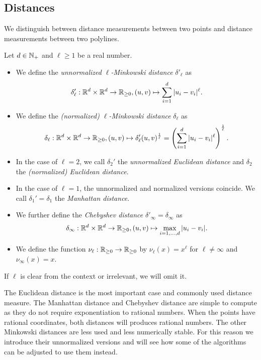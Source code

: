 \subsection{Distances}
\label{ssec:distances}
We distinguish between distance measurements between two points and distance measurements between two polylines. 
\begin{definition}[Distances]\label{def:point_distance}
  Let \(d \in \mathbb{N}_+\) and \(\ell \geq 1\) be a real number.
  \begin{itemize}
    \item We define the \emph{unnormalized \(\ell\)-Minkowski distance} \(\delta'_\ell\) as 
      \[\delta'_\ell:\mathbb{R}^d \times \mathbb{R}^d \to \mathbb{R}_{\geq 0}, (u, v) \mapsto \sum_{i = 1}^d |u_i - v_i|^\ell.\]
    \item We define the \emph{(normalized) \(\ell\)-Minkowski distance} \(\delta_\ell\) as 
      \[\delta_\ell:\mathbb{R}^d \times \mathbb{R}^d \to \mathbb{R}_{\geq 0}, (u, v) \mapsto \delta'_\ell(u, v)^{\frac1\ell} = \left(\sum_{i = 1}^d |u_i - v_i|^\ell\right)^{\frac1\ell}.\]
    \item In the case of \(\ell = 2\), we call \(\delta_2'\)  the \emph{unnormalized Euclidean distance} and \(\delta_2\) the \emph{(normalized) Euclidean distance}.
    \item In the case of \(\ell = 1\), the unnormalized and normalized versions coincide. We call \(\delta_1' = \delta_1\) the \emph{Manhattan distance}. 
    \item We further define the \emph{Chebyshev distance} \(\delta'_\infty = \delta_\infty\) as 
      \[\delta_\infty:\mathbb{R}^d \times \mathbb{R}^d \to \mathbb{R}_{\geq 0}, (u, v) \mapsto \max_{i = 1, \dots, d} |u_i - v_i|.\]
    \item We define the function \(\nu_\ell:\mathbb{R}_{\geq 0} \to \mathbb{R}_{\geq 0}\) by \(\nu_\ell(x) = x^\ell\) for \(\ell \neq \infty\) and \(\nu_\infty(x) = x\).
  \end{itemize}

  If \(\ell\) is clear from the context or irrelevant, we will omit it.
\end{definition}

The Euclidean distance is the most important case and commonly used distance measure. The Manhattan distance and Chebyshev distance are simple to compute as they do not require exponentiation to rational numbers. When the points have rational coordinates, both distances will produces rational numbers.
The other Minkowski distances are less used and less numerically stable. For this reason we introduce their unnormalized versions and will see how some of the algorithms can be adjusted to use them instead. 

